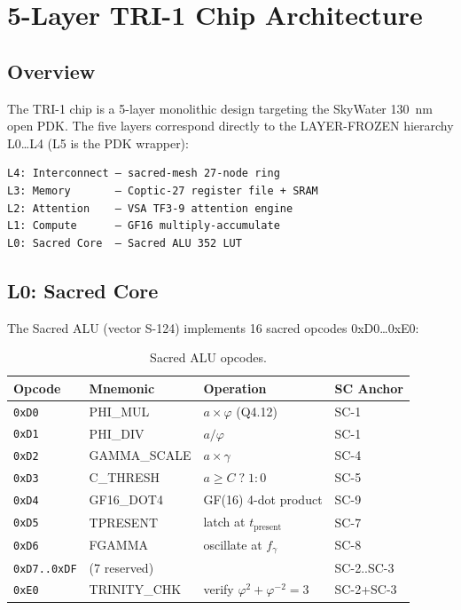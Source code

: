 \section{5-Layer TRI-1 Chip Architecture}
\label{sec:flos74-chip}

\subsection{Overview}

The TRI-1 chip is a 5-layer monolithic design targeting the SkyWater 130~nm open
PDK.
The five layers correspond directly to the LAYER-FROZEN hierarchy L0\ldots L4
(L5 is the PDK wrapper):

\begin{verbatim}
L4: Interconnect — sacred-mesh 27-node ring
L3: Memory       — Coptic-27 register file + SRAM
L2: Attention    — VSA TF3-9 attention engine
L1: Compute      — GF16 multiply-accumulate
L0: Sacred Core  — Sacred ALU 352 LUT
\end{verbatim}

\subsection{L0: Sacred Core}

The Sacred ALU (vector S-124) implements 16 sacred opcodes 0xD0\ldots0xE0:

\begin{table}[h]
\centering
\caption{Sacred ALU opcodes.}
\label{tab:opcodes}
\begin{tabular}{llll}
\hline
Opcode & Mnemonic & Operation & SC Anchor \\
\hline
\texttt{0xD0} & PHI\_MUL & \(a \times \varphi\) (Q4.12) & SC-1 \\
\texttt{0xD1} & PHI\_DIV & \(a / \varphi\) & SC-1 \\
\texttt{0xD2} & GAMMA\_SCALE & \(a \times \gamma\) & SC-4 \\
\texttt{0xD3} & C\_THRESH & \(a \ge C\;?\;1:0\) & SC-5 \\
\texttt{0xD4} & GF16\_DOT4 & GF(16) 4-dot product & SC-9 \\
\texttt{0xD5} & TPRESENT & latch at \(t_{\text{present}}\) & SC-7 \\
\texttt{0xD6} & FGAMMA & oscillate at \(f_\gamma\) & SC-8 \\
\texttt{0xD7..0xDF} & (7 reserved) & & SC-2..SC-3 \\
\texttt{0xE0} & TRINITY\_CHK & verify \(\varphi^2+\varphi^{-2}=3\) & SC-2+SC-3 \\
\hline
\end{tabular}
\end{table}

